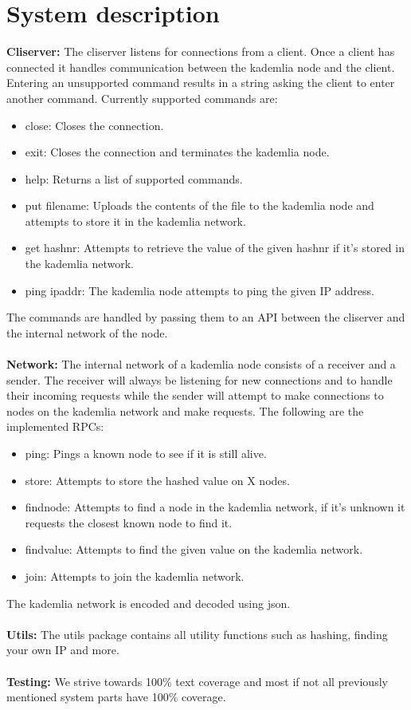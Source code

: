 \section{System description}\label{sec:system description}
\textbf{Cliserver:} The cliserver listens for connections from a client.
Once a client has connected it handles communication between the kademlia node
and the client. Entering an unsupported command results in a string asking the
client to enter another command. Currently supported commands are:

\begin{itemize}
  \item close: Closes the connection.
  \item exit: Closes the connection and terminates the kademlia node.
  \item help: Returns a list of supported commands.
  \item put filename: Uploads the contents of the file to the kademlia node and
attempts to store it in the kademlia network.
  \item get hashnr: Attempts to retrieve the value of the given hashnr if
it's stored in the kademlia network.
  \item ping ipaddr: The kademlia node attempts to ping the given IP address.
\end{itemize}

The commands are handled by passing them to an API between the cliserver and
the internal network of the node.\\\\
\textbf{Network:} The internal network of a kademlia node consists of a receiver
and a sender. The receiver will always be listening for new connections and to
handle their incoming requests while the sender will attempt to make connections
to nodes on the kademlia network and make requests. The following are the
implemented RPCs:

\begin{itemize}
  \item ping: Pings a known node to see if it is still alive.
  \item store: Attempts to store the hashed value on X nodes.
  \item findnode: Attempts to find a node in the kademlia network, if it's unknown
it requests the closest known node to find it.
  \item findvalue: Attempts to find the given value on the kademlia network.
  \item join: Attempts to join the kademlia network.
\end{itemize}

The kademlia network is encoded and decoded using json.\\\\
\textbf{Utils:} The utils package contains all utility functions such as hashing,
finding your own IP and more.\\\\
\textbf{Testing:} We strive towards 100\% text coverage and most if not all
previously mentioned system parts have 100\% coverage.
